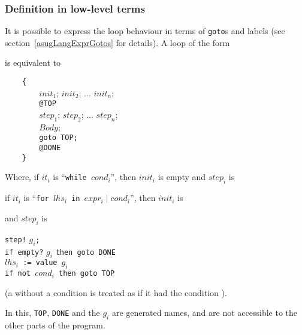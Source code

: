 \subsubsection{Definition in low-level terms}

It is possible to express the loop behaviour in terms of
\verb"goto"s and labels (see section~\ref{asugLangExprGotos} for 
details).  A loop of the form


is equivalent to 

\verb"    {" \\
\verb"        "$init_1$; $init_2$; ... $init_n$; \\
\verb"        @TOP" \\
\verb"        "$step_1$; $step_2$; ... $step_n$; \\
\verb"        "$Body$; \\
\verb"        "\verb"goto TOP;" \\
\verb"        @DONE" \\
\verb"    }"

Where,
if $it_i$ is ``{\tt while $cond_i$}'', then $init_i$ is empty
and $step_i$ is 


if $it_i$ is ``{\tt for $lhs_i$ in $expr_i \mid cond_i$}'',
then $init_i$ is


\hspace{4mm}and $step_i$ is

\hspace{8mm}\parbox{60mm}
{
{\tt step!} $\!g_i${\tt ;}\\
{\tt if empty?} $g_i$ {\tt then goto DONE}\\
{\tt $lhs_i$ := value $g_i$}\\
{\tt if not $cond_i$ then goto TOP}
}

\hspace{4mm}(a  without a condition is treated as if it had 
the condition ).


In this, \verb"TOP", \verb"DONE" and the $g_i$ are generated
names, and are not accessible to the other parts of the program.
